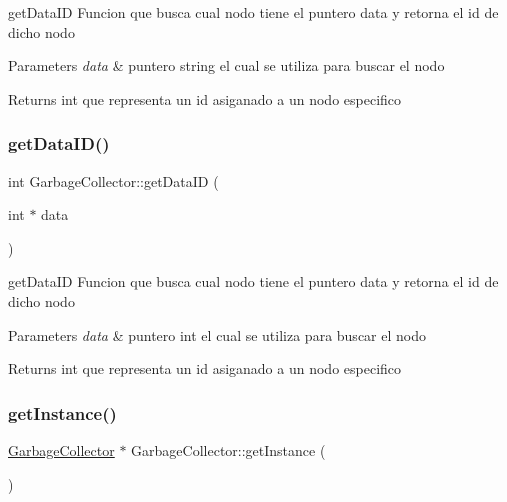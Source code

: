 get\+Data\+ID Funcion que busca cual nodo tiene el puntero data y retorna el id de dicho nodo 


\begin{DoxyParams}{Parameters}
{\em data} & puntero string el cual se utiliza para buscar el nodo \\
\hline
\end{DoxyParams}
\begin{DoxyReturn}{Returns}
int que representa un id asiganado a un nodo especifico 
\end{DoxyReturn}
\mbox{\label{class_garbage_collector_ae35f99070654ac6e4beedc41d0685739}} 
\subsubsection{\texorpdfstring{get\+Data\+I\+D()}{getDataID()}\hspace{0.1cm}{\footnotesize\ttfamily [3/3]}}
{\footnotesize\ttfamily int Garbage\+Collector\+::get\+Data\+ID (\begin{DoxyParamCaption}\item[{int $\ast$}]{data }\end{DoxyParamCaption})}



get\+Data\+ID Funcion que busca cual nodo tiene el puntero data y retorna el id de dicho nodo 


\begin{DoxyParams}{Parameters}
{\em data} & puntero int el cual se utiliza para buscar el nodo \\
\hline
\end{DoxyParams}
\begin{DoxyReturn}{Returns}
int que representa un id asiganado a un nodo especifico 
\end{DoxyReturn}
\mbox{\label{class_garbage_collector_ade4bccdf41223cc395b646db3f60ac8b}} 
\subsubsection{\texorpdfstring{get\+Instance()}{getInstance()}}
{\footnotesize\ttfamily \hyperlink{class_garbage_collector}{Garbage\+Collector} $\ast$ Garbage\+Collector\+::get\+Instance (\begin{DoxyParamCaption}{ }\end{DoxyParamCaption})\hspace{0.3cm}{\ttfamily [static]}}



